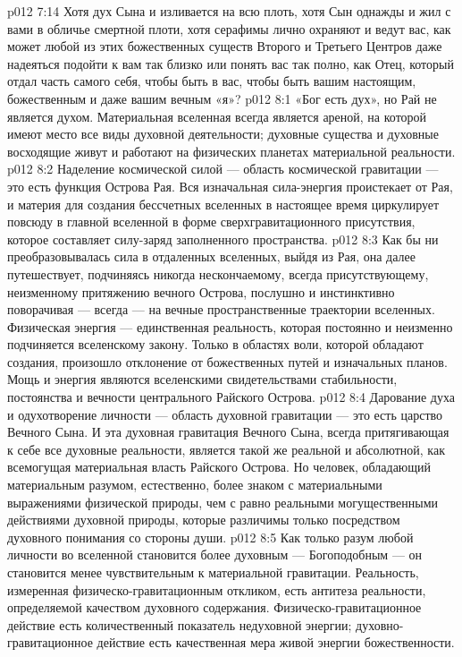 \vs p012 7:14 Хотя дух Сына и изливается на всю плоть, хотя Сын однажды и жил с вами в обличье смертной плоти, хотя серафимы лично охраняют и ведут вас, как может любой из этих божественных существ Второго и Третьего Центров даже надеяться подойти к вам так близко или понять вас так полно, как Отец, который отдал часть самого себя, чтобы быть в вас, чтобы быть вашим настоящим, божественным и даже вашим вечным «я»?
\vs p012 8:1 «Бог есть дух», но Рай не является духом. Материальная вселенная всегда является ареной, на которой имеют место все виды духовной деятельности; духовные существа и духовные восходящие живут и работают на физических планетах материальной реальности.
\vs p012 8:2 \pc Наделение космической силой --- область космической гравитации --- это есть функция Острова Рая. Вся изначальная сила\hyp{}энергия проистекает от Рая, и материя для создания бессчетных вселенных в настоящее время циркулирует повсюду в главной вселенной в форме сверхгравитационного присутствия, которое составляет силу\hyp{}заряд заполненного пространства.
\vs p012 8:3 Как бы ни преобразовывалась сила в отдаленных вселенных, выйдя из Рая, она далее путешествует, подчиняясь никогда нескончаемому, всегда присутствующему, неизменному притяжению вечного Острова, послушно и инстинктивно поворачивая --- всегда --- на вечные пространственные траектории вселенных. Физическая энергия --- единственная реальность, которая постоянно и неизменно подчиняется вселенскому закону. Только в областях воли, которой обладают создания, произошло отклонение от божественных путей и изначальных планов. Мощь и энергия являются вселенскими свидетельствами стабильности, постоянства и вечности центрального Райского Острова.
\vs p012 8:4 \pc Дарование духа и одухотворение личности --- область духовной гравитации --- это есть царство Вечного Сына. И эта духовная гравитация Вечного Сына, всегда притягивающая к себе все духовные реальности, является такой же реальной и абсолютной, как всемогущая материальная власть Райского Острова. Но человек, обладающий материальным разумом, естественно, более знаком с материальными выражениями физической природы, чем с равно реальными могущественными действиями духовной природы, которые различимы только посредством духовного понимания со стороны души.
\vs p012 8:5 Как только разум любой личности во вселенной становится более духовным --- Богоподобным --- он становится менее чувствительным к материальной гравитации. Реальность, измеренная физическо\hyp{}гравитационным откликом, есть антитеза реальности, определяемой качеством духовного содержания. Физическо\hyp{}гравитационное действие есть количественный показатель недуховной энергии; духовно\hyp{}гравитационное действие есть качественная мера живой энергии божественности.
